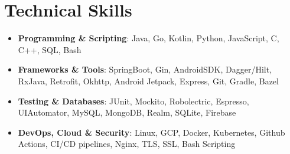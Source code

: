 \documentclass[letterpaper,1pt]{article}
\begin{document}
%
\section{Technical Skills}
\begin{itemize}[leftmargin=*, itemsep=1pt, parsep=0pt]
  \selectfont\small
  \setlength\itemsep{0em}
  \setlength\parsep{0em}
  \item \textbf{Programming \& Scripting}: Java, Go, Kotlin, Python, JavaScript, C, C++, SQL, Bash
  \item \textbf{Frameworks \& Tools}: SpringBoot, Gin, AndroidSDK, Dagger/Hilt, RxJava, Retrofit, Okhttp, Android Jetpack, Express, Git, Gradle, Bazel
  \item \textbf{Testing \& Databases}: JUnit, Mockito, Robolectric, Espresso, UIAutomator, MySQL, MongoDB, Realm, SQLite, Firebase
  \item \textbf{DevOps, Cloud \& Security}: Linux, GCP, Docker, Kubernetes, Github Actions, CI/CD pipelines, Nginx, TLS, SSL, Bash Scripting
\end{itemize}


\end{document}
